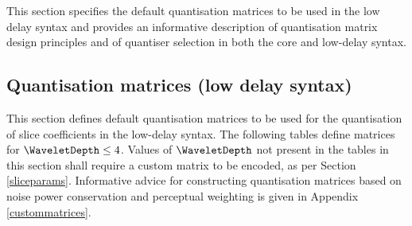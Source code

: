 \label{quantmatrices}

This section specifies the default quantisation matrices to be used
in the low delay syntax and provides an informative description of quantisation
matrix design principles and of quantiser selection in both the core
and low-delay syntax.

\subsection{Quantisation matrices (low delay syntax)}
\label{defaultquantmatrices}

This section defines default quantisation matrices to be used 
for the quantisation of slice coefficients in the low-delay syntax.
The following tables define matrices for $\WaveletDepth\leq 4$. 
Values of $\WaveletDepth$ not present in the tables
in this section shall require a custom matrix to be encoded, 
as per Section \ref{sliceparams}. Informative advice for 
constructing quantisation matrices based on noise power 
conservation and perceptual weighting is given in 
Appendix \ref{custommatrices}.

